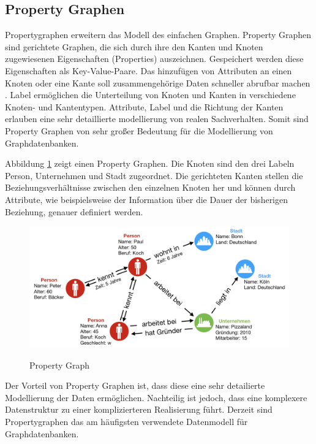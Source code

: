 \subsection{Property Graphen}
Propertygraphen erweitern das Modell des einfachen Graphen.
Property Graphen sind gerichtete Graphen, die sich durch ihre den Kanten und Knoten zugewiesenen Eigenschaften (Properties) auszeichnen.
Gespeichert werden diese Eigenschaften als Key-Value-Paare.
Das hinzufügen von Attributen an einen Knoten oder eine Kante soll zusammengehörige Daten schneller abrufbar machen \cite{angles2012comparison}.
Label ermöglichen die Unterteilung von Knoten und Kanten in verschiedene Knoten- und Kantentypen.
Attribute, Label und die Richtung der Kanten erlauben eine sehr detaillierte modellierung von realen Sachverhalten.
Somit sind Property Graphen von sehr großer Bedeutung für die Modellierung von Graphdatenbanken.

Abbildung \ref{fig:property} zeigt einen Property Graphen.
Die Knoten sind den drei Labeln Person, Unternehmen und Stadt zugeordnet.
Die gerichteten Kanten stellen die Beziehungsverhältnisse zwischen den einzelnen Knoten her und können durch Attribute, wie beispielsweise der Information über die Dauer der bisherigen Beziehung, genauer definiert werden.
\begin{figure}[H]
\begin{center}
	\includegraphics[scale = 0.65]{./images/Property_graph.png}
	\label{fig:property}
	\caption{Property Graph}
\end{center}
\end{figure}


Der Vorteil von Property Graphen ist, dass diese eine sehr detailierte Modellierung der Daten ermöglichen.
Nachteilig ist jedoch, dass eine komplexere Datenstruktur zu einer komplizierteren Realisierung führt.
Derzeit sind Propertygraphen das am häufigsten verwendete Datenmodell für Graphdatenbanken.

